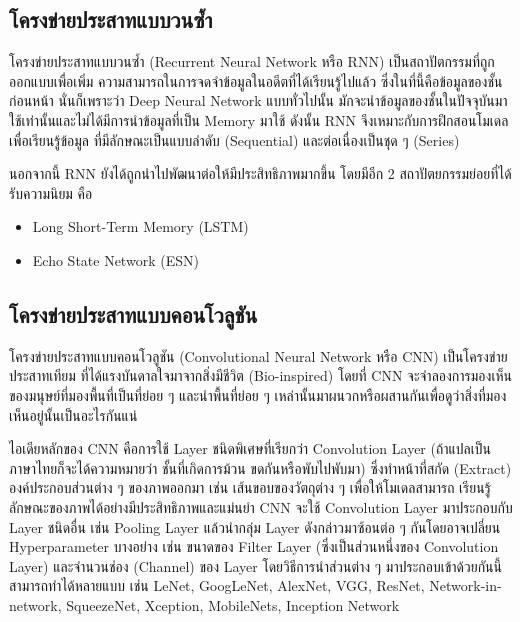 \subsection{โครงข่ายประสาทแบบวนซ้ำ}
\label{ssec:rnn}

โครงข่ายประสาทแบบวนซ้ำ (Recurrent Neural Network หรือ RNN)\autocite{abiodun2018} เป็นสถาปัตกรรมที่ถูกออกแบบเพื่อเพิ่ม%
ความสามารถในการจดจำข้อมูลในอดีตที่ได้เรียนรู้ไปแล้ว ซึ่งในที่นี้คือข้อมูลของชั้นก่อนหน้า นั่นก็เพราะว่า Deep Neural Network แบบทั่วไปนั้น%
มักจะนำข้อมูลของชั้นในปัจจุบันมาใช้เท่านั้นและไม่ได้มีการนำข้อมูลที่เป็น Memory มาใช้ ดังนั้น RNN จึงเหมาะกับการฝึกสอนโมเดลเพื่อเรียนรู้ข้อมูล%
ที่มีลักษณะเป็นแบบลำดับ (Sequential) และต่อเนื่องเป็นชุด ๆ (Series)

นอกจากนี้ RNN ยังได้ถูกนำไปพัฒนาต่อให้มีประสิทธิภาพมากขึ้น โดยมีอีก 2 สถาปัตยกรรมย่อยที่ได้รับความนิยม คือ

\begin{itemize}[topsep=0pt,noitemsep]
    \item Long Short-Term Memory (LSTM)\autocite{hochreiter1997a}
    \item Echo State Network (ESN)\autocite{jaeger2004}
\end{itemize}

\subsection{โครงข่ายประสาทแบบคอนโวลูชัน}
\label{ssec:cnn}

โครงข่ายประสาทแบบคอนโวลูชัน (Convolutional Neural Network หรือ CNN)\autocite{alzubaidi2021} เป็นโครงข่ายประสาทเทียม%
ที่ได้แรงบันดาลใจมาจากสิ่งมีชีวิต (Bio-inspired) โดยที่ CNN จะจำลองการมองเห็นของมนุษย์ที่มองพื้นที่เป็นที่ย่อย ๆ และนำพื้นที่ย่อย ๆ 
เหล่านั้นมาผนวกหรือผสานกันเพื่อดูว่าสิ่งที่มองเห็นอยู่นั้นเป็นอะไรกันแน่

ไอเดียหลักของ CNN คือการใช้ Layer ชนิดพิเศษที่เรียกว่า Convolution Layer (ถ้าแปลเป็นภาษาไทยก็จะได้ความหมายว่า ชั้นที่เกิดการม้วน%
ขดกันหรือพับไปพับมา) ซึ่งทำหน้าที่สกัด (Extract) องค์ประกอบส่วนต่าง ๆ ของภาพออกมา เช่น เส้นขอบของวัตถุต่าง ๆ เพื่อให้โมเดลสามารถ%
เรียนรู้ลักษณะของภาพได้อย่างมีประสิทธิภาพและแม่นยำ CNN จะใช้ Convolution Layer มาประกอบกับ Layer ชนิดอื่น เช่น Pooling Layer 
แล้วนำกลุ่ม Layer ดังกล่าวมาซ้อนต่อ ๆ กันโดยอาจเปลี่ยน Hyperparameter บางอย่าง เช่น ขนาดของ Filter Layer (ซึ่งเป็นส่วนหนึ่งของ 
Convolution Layer) และจำนวนช่อง (Channel) ของ Layer โดยวิธีการนำส่วนต่าง ๆ มาประกอบเข้าด้วยกันนี้สามารถทำได้หลายแบบ เช่น 
LeNet, GoogLeNet, AlexNet, VGG, ResNet, Network-in-network, SqueezeNet, Xception, MobileNets, Inception Network

